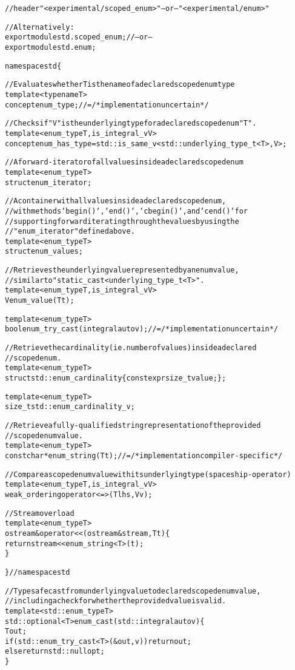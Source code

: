 \documentclass[a4paper, 12pt]{article}
\begin{document}
\begin{alltt}\footnotesize
// header "<experimental/scoped\_enum>" -- or -- "<experimental/enum>"

// Alternatively:
export module std.scoped\_enum; // -- or --
export module std.enum;

namespace std \{

  // Evaluates whether T is the name of a declared scoped enum type
  template<typename T>
  concept enum\_type; // = /* implementation uncertain */

  // Checks if "V" is the underlying type for a declared scoped enum "T".
  template<enum\_type T, is\_integral\_v V>
  concept enum\_has\_type = std::is\_same\_v<std::underlying\_type\_t<T>, V>;

  // A forward-iterator of all values inside a declared scoped enum
  template<enum\_type T>
  struct enum\_iterator;

  // A container with all values inside a declared scoped enum,
  // with methods `begin()`, `end()`, `cbegin()`, and `cend()` for
  // supporting forward iterating through the values by using the
  // "enum\_iterator" defined above.
  template<enum\_type T>
  struct enum\_values;

  // Retrieves the underlying value represented by an enum value,
  // similar to "static\_cast<underlying\_type\_t<T>".
  template<enum\_type T, is\_integral\_v V>
  V enum\_value(T t);

  template<enum\_type T>
  bool enum\_try\_cast(integral auto v); // = /* implementation uncertain */

  // Retrieve the cardinality (ie. number of values) inside a declared
  // scoped enum.
  template<enum\_type T>
  struct std::enum\_cardinality \{ constexpr size\_t value; \};

  template<enum\_type T>
  size\_t std::enum\_cardinality\_v;

  // Retrieve a fully-qualified string representation of the provided
  // scoped enum value.
  template<enum\_type T>
  const char* enum\_string(T t); // = /* implementation compiler-specific */

  // Compare a scoped enum value with its underlying type (spaceship-operator)
  template<enum\_type T, is\_integral\_v V>
  weak\_ordering operator<=>(T lhs, V v);

  // Stream overload
  template<enum\_type T>
  ostream& operator<<(ostream& stream, T t) \{
    return stream << enum\_string<T>(t);
  \}

\} // namespace std

// Typesafe cast from underlying value to declared scoped enum value,
// including a check for whether the provided value is valid.
template<std::enum\_type T>
std::optional<T> enum\_cast(std::integral auto v) \{
  T out;
  if (std::enum\_try\_cast<T>(&out, v)) return out;
  else return std::nullopt;
\}

\end{alltt}
\end{document}
